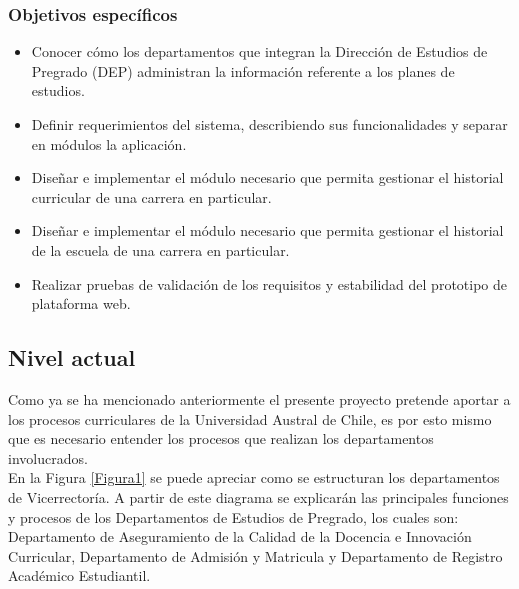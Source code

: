 	\subsubsection{Objetivos específicos}
	
	\begin{itemize}
		\item Conocer cómo los departamentos que integran la Dirección de Estudios de Pregrado (DEP) administran
		la información referente a los planes de estudios.
		\item  Definir requerimientos del sistema, describiendo sus funcionalidades y separar en módulos la aplicación.
		\item Diseñar e implementar el módulo necesario que permita gestionar el historial curricular de una carrera en particular.
		\item Diseñar e implementar el módulo necesario que permita gestionar el historial de la escuela de una carrera en particular.
		\item Realizar pruebas de validación de los requisitos y estabilidad del prototipo de plataforma web.
	\end{itemize}
	\subsection{Nivel actual}
	
		Como ya se ha mencionado anteriormente el presente proyecto pretende aportar a los procesos curriculares de la Universidad Austral de Chile, es por esto mismo que es necesario entender los procesos que realizan los departamentos involucrados.
		\\
		
		En la Figura \ref{Figura1} se puede apreciar como se estructuran los departamentos de Vicerrectoría. A partir de este diagrama se explicarán las principales funciones y procesos de los Departamentos de Estudios de Pregrado, los cuales son: Departamento de Aseguramiento de la Calidad de la Docencia e Innovación Curricular, Departamento de Admisión y Matricula y Departamento de Registro Académico Estudiantil.
	
